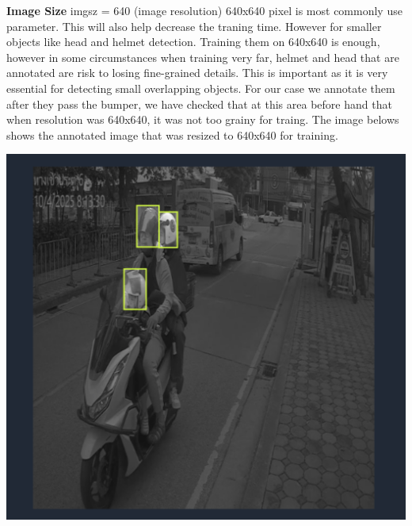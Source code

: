 \textbf{Image Size} imgsz = 640 (image resolution) 640x640 pixel is most commonly use parameter. This will also help decrease the traning time. However for smaller objects like head and helmet detection. Training them on 640x640 is enough, however in some circumstances when training very far, helmet and head that are annotated are risk to losing fine-grained details. This is important as it is very essential for detecting small overlapping objects. For our case we annotate them after they pass the bumper, we have checked that at this area before hand that when resolution was 640x640, it was not too grainy for traing. The image belows shows the annotated image that was resized to 640x640 for training. 


\begin{center}
	\begin{minipage}{0.45\textwidth}
		\centering
		\includegraphics[width=\linewidth]{ano1.png}
		\vspace{0.7em}
		

\end{minipage}
\end{center}
